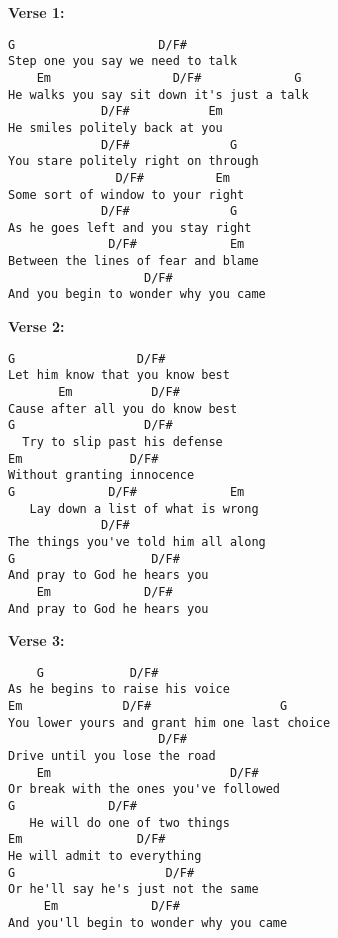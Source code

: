 \begin{minipage}[t]{0.49\textwidth}
\textbf{Verse 1:}
\begin{lstlisting}
G                    D/F#
Step one you say we need to talk
    Em                 D/F#             G
He walks you say sit down it's just a talk
             D/F#           Em
He smiles politely back at you
             D/F#              G
You stare politely right on through
               D/F#          Em
Some sort of window to your right
             D/F#              G
As he goes left and you stay right
              D/F#             Em
Between the lines of fear and blame
                   D/F#
And you begin to wonder why you came
\end{lstlisting}
\bigskip
\textbf{Verse 2:}
\begin{lstlisting}
G                 D/F#
Let him know that you know best
       Em           D/F#
Cause after all you do know best
G                  D/F#
  Try to slip past his defense
Em               D/F#
Without granting innocence
G             D/F#             Em
   Lay down a list of what is wrong
             D/F#
The things you've told him all along
G                   D/F#
And pray to God he hears you
    Em             D/F#
And pray to God he hears you
\end{lstlisting}
\bigskip
\textbf{Verse 3:}
\begin{lstlisting}
    G            D/F#
As he begins to raise his voice
Em              D/F#                  G
You lower yours and grant him one last choice
					 D/F#
Drive until you lose the road
    Em                         D/F#
Or break with the ones you've followed
G             D/F#
   He will do one of two things
Em                D/F#
He will admit to everything
G                     D/F#
Or he'll say he's just not the same
     Em             D/F#
And you'll begin to wonder why you came
\end{lstlisting}
\end{minipage}%
